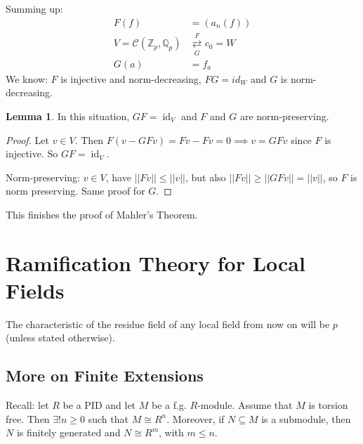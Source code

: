\documentclass[a4paper]{article}
\theoremstyle{definition}
\theoremstyle{default}
\newtheorem{lemma}[definition]{Lemma}
\theoremstyle{remark}
\newcommand*\abs[1]{\left|#1\right|}
\newcommand*\norm[1]{\abs{\abs{#1}}}
\DeclareMathOperator{\id}{id}
\begin{document}
Summing up:
\begin{align*}
	F(f) &= (a_n(f)) \\
	V = \mathcal{C}(\mathbb{Z}_p, \mathbb{Q}_p) &\underset{G}{\overset{F}{\rightleftarrows}} c_0 = W \\
	G(a) &= f_a
\end{align*}
We know: $F$ is injective and norm-decreasing,
$FG = id_W$ and $G$ is norm-decreasing.

\begin{lemma}
	In this situation,
	$GF = \id_V$ and $F$ and $G$ are norm-preserving.
\end{lemma}
\begin{proof}
	Let $v \in V$.
	Then $F(v-GFv) = Fv - Fv = 0 \implies v = GFv$ since $F$ is injective.
	So $GF = \id_V$.
	
	Norm-preserving: $v \in V$,
	have $\norm{Fv} \leq \norm{v}$,
	but also $\norm{Fv} \geq \norm{GFv} = \norm{v}$,
	so $F$ is norm preserving.
	Same proof for $G$.
\end{proof}

This finishes the proof of Mahler's Theorem.

\section{Ramification Theory for Local Fields}

The characteristic of the residue field of any local field from now on will be $p$ (unless stated otherwise).

\subsection{More on Finite Extensions}

Recall: let $R$ be a PID and let $M$ be a f.g. $R$-module.
Assume that $M$ is torsion free.
Then $\exists! n \geq 0$ such that $M \cong R^n$.
Moreover, if $N \subseteq M$ is a submodule,
then $N$ is finitely generated and $N \cong R^m$, with $m \leq n$.
\end{document}
